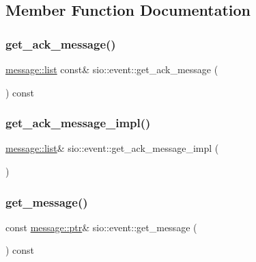 \subsection{Member Function Documentation}
\mbox{\label{classsio_1_1event_a03d343ade27c0cdf35f4e31ea996e7da}} 
\subsubsection{\texorpdfstring{get\+\_\+ack\+\_\+message()}{get\_ack\_message()}}
{\footnotesize\ttfamily \hyperlink{classsio_1_1message_1_1list}{message\+::list} const\& sio\+::event\+::get\+\_\+ack\+\_\+message (\begin{DoxyParamCaption}{ }\end{DoxyParamCaption}) const}

\mbox{\label{classsio_1_1event_a777c67213b1373320bd759225fe62716}} 
\subsubsection{\texorpdfstring{get\+\_\+ack\+\_\+message\+\_\+impl()}{get\_ack\_message\_impl()}}
{\footnotesize\ttfamily \hyperlink{classsio_1_1message_1_1list}{message\+::list}\& sio\+::event\+::get\+\_\+ack\+\_\+message\+\_\+impl (\begin{DoxyParamCaption}{ }\end{DoxyParamCaption})\hspace{0.3cm}{\ttfamily [protected]}}

\mbox{\label{classsio_1_1event_af72f3e38225ee8768c183d28d717a3da}} 
\subsubsection{\texorpdfstring{get\+\_\+message()}{get\_message()}}
{\footnotesize\ttfamily const \hyperlink{classsio_1_1message_a6340b6fef57e4516eb17928b1885a615}{message\+::ptr}\& sio\+::event\+::get\+\_\+message (\begin{DoxyParamCaption}{ }\end{DoxyParamCaption}) const}

